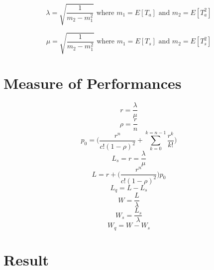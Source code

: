 \documentclass{article}
\theoremstyle{definition}
\begin{document}
\begin{equation}
\lambda =\sqrt{\dfrac{1}{m_{2}-m_{1}^{2}}} \text{ where } m_{1}= E[T_{a}] \text{ and } m_{2}= E[T_{a}^{2}]
\end{equation}

\begin{equation}
\mu =\sqrt{\dfrac{1}{m_{2}-m_{1}^{2}}} \text{ where } m_{1}= E[T_{s}] \text{ and } m_{2}= E[T_{s}^{2}]
\end{equation}

\section{Measure of Performances}
\begin{equation}
r=\dfrac{\lambda}{\mu}
\end{equation}
\begin{equation}
\rho=\dfrac{r}{n}
\end{equation}
\begin{equation}
p_{0}=\bigg(\dfrac{r^{n}}{c!(1-\rho)^{2}}  + \sum_{k=0}^{k=n-1}\dfrac{r^{k}}{k!}\bigg) 
\end{equation}
\begin{equation}
L_{s}=r=\dfrac{\lambda}{\mu}
\end{equation}
\begin{equation}
L=r+ \bigg(\dfrac{r^{n}}{c!(1-\rho)^{2}}\bigg)p_{0}
\end{equation}
\begin{equation}
L_{q}=L-L_{s}
\end{equation}
\begin{equation}
W=\dfrac{L}{\lambda}
\end{equation}
\begin{equation}
W_{s}=\dfrac{L_{s}}{\lambda}
\end{equation}
\begin{equation}
W_{q}=W-W_{s}
\end{equation}


\section{Result}
\end{document}

